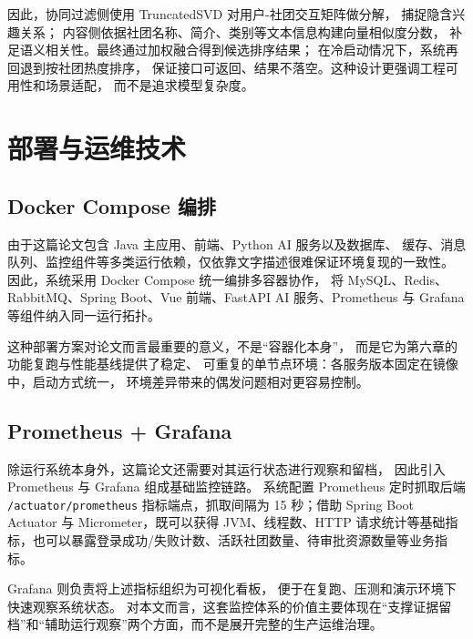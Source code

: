 因此，协同过滤侧使用 TruncatedSVD 对用户-社团交互矩阵做分解，
捕捉隐含兴趣关系\cite{svd_recommend,collaborative_filtering2009}；
内容侧依据社团名称、简介、类别等文本信息构建向量相似度分数，
补足语义相关性。最终通过加权融合得到候选排序结果；
在冷启动情况下，系统再回退到按社团热度排序，
保证接口可返回、结果不落空。这种设计更强调工程可用性和场景适配，
而不是追求模型复杂度。

\section{部署与运维技术}

\subsection{Docker Compose 编排}

由于这篇论文包含 Java 主应用、前端、Python AI 服务以及数据库、
缓存、消息队列、监控组件等多类运行依赖，仅依靠文字描述很难保证环境复现的一致性。
因此，系统采用 Docker Compose 统一编排多容器协作\cite{docker_cloud}，
将 MySQL、Redis、RabbitMQ、Spring Boot、Vue 前端、FastAPI AI 服务、Prometheus 与 Grafana 等组件纳入同一运行拓扑。

这种部署方案对论文而言最重要的意义，不是“容器化本身”，
而是它为第六章的功能复跑与性能基线提供了稳定、
可重复的单节点环境：各服务版本固定在镜像中，启动方式统一，
环境差异带来的偶发问题相对更容易控制。

\subsection{Prometheus + Grafana}

除运行系统本身外，这篇论文还需要对其运行状态进行观察和留档，
因此引入 Prometheus 与 Grafana 组成基础监控链路。
系统配置 Prometheus 定时抓取后端 \texttt{/actuator/prometheus} 指标端点，抓取间隔为 15 秒；借助 Spring Boot Actuator 与 Micrometer，既可以获得 JVM、线程数、HTTP 请求统计等基础指标，也可以暴露登录成功/失败计数、活跃社团数量、待审批资源数量等业务指标。

Grafana 则负责将上述指标组织为可视化看板，
便于在复跑、压测和演示环境下快速观察系统状态。
对本文而言，这套监控体系的价值主要体现在“支撑证据留档”和“辅助运行观察”两个方面，而不是展开完整的生产运维治理。